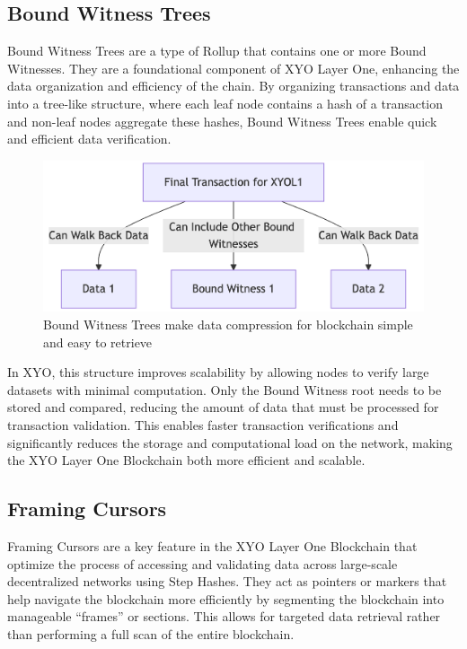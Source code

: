 \documentclass{article}
\begin{document}
\subsection{Bound Witness Trees}
Bound Witness Trees are a type of Rollup that contains one or more Bound Witnesses. They are a foundational component of XYO Layer One, enhancing the data organization and efficiency of the chain. By organizing transactions and data into a tree-like structure, where each leaf node contains a hash of a transaction and non-leaf nodes aggregate these hashes, Bound Witness Trees enable quick and efficient data verification. 

\begin{figure}[ht]
    \centering
    \includegraphics[width=15cm]{bound-witness-trees.png}
    \caption{Bound Witness Trees make data compression for blockchain simple and easy to retrieve}
\end{figure}

In XYO, this structure improves scalability by allowing nodes to verify large datasets with minimal computation. Only the Bound Witness root needs to be stored and compared, reducing the amount of data that must be processed for transaction validation. This enables faster transaction verifications and significantly reduces the storage and computational load on the network, making the XYO Layer One Blockchain both more efficient and scalable.

\subsection{Framing Cursors}
Framing Cursors are a key feature in the XYO Layer One Blockchain that optimize the process of accessing and validating data across large-scale decentralized networks using Step Hashes. They act as pointers or markers that help navigate the blockchain more efficiently by segmenting the blockchain into manageable “frames” or sections. This allows for targeted data retrieval rather than performing a full scan of the entire blockchain. 
\end{document}
